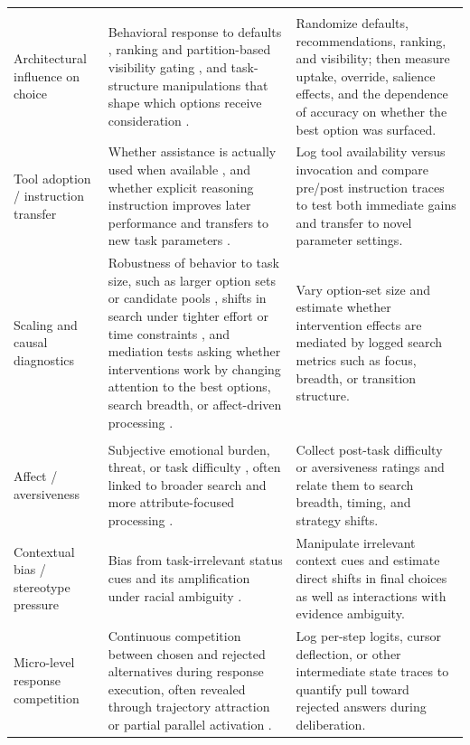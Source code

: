 {\begin{longtable}{@{}p{} p{} p{}@{}}
\addlinespace
\multicolumn{3}{@{}l}{\textbf{Intervention response and robustness}} \\
Architectural influence on choice & Behavioral response to defaults \citep{johnson2013can}, ranking and partition-based visibility gating \citep{dellaert2024choice}, and task-structure manipulations that shape which options receive consideration \citep{lau2006voters}. & Randomize defaults, recommendations, ranking, and visibility; then measure uptake, override, salience effects, and the dependence of accuracy on whether the best option was surfaced. \\
Tool adoption / instruction transfer & Whether assistance is actually used when available \citep{hodge2004does}, and whether explicit reasoning instruction improves later performance and transfers to new task parameters \citep{johnson2002detecting}. & Log tool availability versus invocation and compare pre/post instruction traces to test both immediate gains and transfer to novel parameter settings. \\
Scaling and causal diagnostics & Robustness of behavior to task size, such as larger option sets or candidate pools \citep{johnson2013can,dellaert2024choice,lau2006voters}, shifts in search under tighter effort or time constraints \citep{payne1988adaptive}, and mediation tests asking whether interventions work by changing attention to the best options, search breadth, or affect-driven processing \citep{dellaert2024choice,luce1997choice}. & Vary option-set size and estimate whether intervention effects are mediated by logged search metrics such as focus, breadth, or transition structure. \\
\addlinespace
\multicolumn{3}{@{}l}{\textbf{Context, affect, and interaction}} \\
Affect / aversiveness & Subjective emotional burden, threat, or task difficulty \citep{luce1997choice}, often linked to broader search and more attribute-focused processing \citep{luce1997choice}. & Collect post-task difficulty or aversiveness ratings and relate them to search breadth, timing, and strategy shifts. \\
Contextual bias / stereotype pressure & Bias from task-irrelevant status cues \citep{freeman2011looking} and its amplification under racial ambiguity \citep{freeman2011looking}. & Manipulate irrelevant context cues and estimate direct shifts in final choices as well as interactions with evidence ambiguity. \\
Micro-level response competition & Continuous competition between chosen and rejected alternatives during response execution, often revealed through trajectory attraction or partial parallel activation \citep{freeman2011looking}. & Log per-step logits, cursor deflection, or other intermediate state traces to quantify pull toward rejected answers during deliberation. \\

\end{longtable}}
